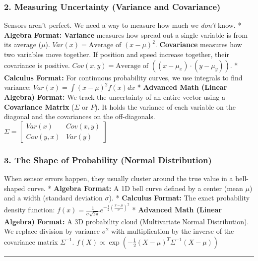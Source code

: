 \documentclass[
]{article}
\begin{document}
\subsubsection{2. Measuring Uncertainty (Variance and
Covariance)}\label{measuring-uncertainty-variance-and-covariance}

Sensors aren't perfect. We need a way to measure how much we
\emph{don't} know. * \textbf{Algebra Format:} \textbf{Variance} measures
how spread out a single variable is from its average (\(\mu\)).
\(Var(x) = \text{Average of } (x - \mu)^2\). \textbf{Covariance}
measures how two variables move together. If position and speed increase
together, their covariance is positive.
\(Cov(x, y) = \text{Average of } ((x - \mu_x) \cdot (y - \mu_y))\). *
\textbf{Calculus Format:} For continuous probability curves, we use
integrals to find variance: \(Var(x) = \int (x - \mu)^2 f(x) dx\) *
\textbf{Advanced Math (Linear Algebra) Format:} We track the uncertainty
of an entire vector using a \textbf{Covariance Matrix} (\(\Sigma\) or
\(P\)). It holds the variance of each variable on the diagonal and the
covariances on the off-diagonals.
\(\Sigma = \begin{bmatrix} Var(x) & Cov(x, y) \\ Cov(y, x) & Var(y) \end{bmatrix}\)

\subsubsection{3. The Shape of Probability (Normal
Distribution)}\label{the-shape-of-probability-normal-distribution}

When sensor errors happen, they usually cluster around the true value in
a bell-shaped curve. * \textbf{Algebra Format:} A 1D bell curve defined
by a center (mean \(\mu\)) and a width (standard deviation \(\sigma\)).
* \textbf{Calculus Format:} The exact probability density function:
\(f(x) = \frac{1}{\sigma \sqrt{2\pi}} e^{-\frac{1}{2}(\frac{x-\mu}{\sigma})^2}\)
* \textbf{Advanced Math (Linear Algebra) Format:} A 3D probability cloud
(Multivariate Normal Distribution). We replace division by variance
\(\sigma^2\) with multiplication by the inverse of the covariance matrix
\(\Sigma^{-1}\).
\(f(X) \propto \exp\left( -\frac{1}{2} (X - \mu)^T \Sigma^{-1} (X - \mu) \right)\)

\begin{center}\rule{0.5\linewidth}{0.5pt}\end{center}
\end{document}
